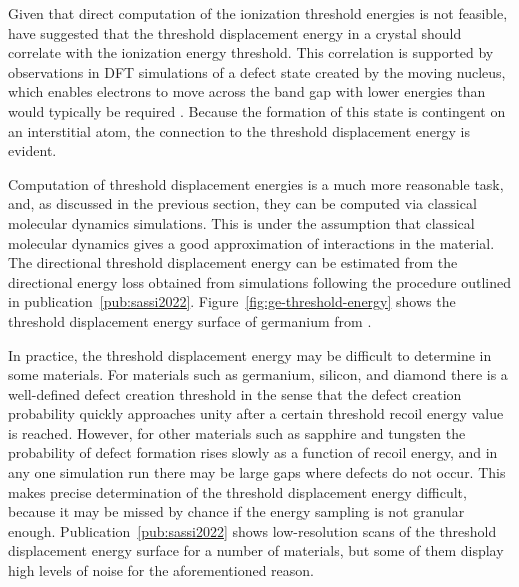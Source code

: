 Given that direct computation of the ionization threshold energies is not feasible, \textcite{KadribasicEtAl2018} have suggested that the threshold displacement energy in a crystal should correlate with the ionization energy threshold. This correlation is supported by observations in DFT simulations of a defect state created by the moving nucleus, which enables electrons to move across the band gap with lower energies than would typically be required \parencite{LimEtAl2016}. Because the formation of this state is contingent on an interstitial atom, the connection to the threshold displacement energy is evident.

Computation of threshold displacement energies is a much more reasonable task, and, as discussed in the previous section, they can be computed via classical molecular dynamics simulations. This is under the assumption that classical molecular dynamics gives a good approximation of interactions in the material. The directional threshold displacement energy can be estimated from the directional energy loss obtained from simulations following the procedure outlined in publication~\ref{pub:sassi2022}. Figure~\ref{fig:ge-threshold-energy} shows the threshold displacement energy surface of germanium from \textcite{KadribasicEtAl2018}. 

In practice, the threshold displacement energy may be difficult to determine in some materials. For materials such as germanium, silicon, and diamond there is a well-defined defect creation threshold in the sense that the defect creation probability quickly approaches unity after a certain threshold recoil energy value is reached. However, for other materials such as sapphire and tungsten the probability of defect formation rises slowly as a function of recoil energy, and in any one simulation run there may be large gaps where defects do not occur. This makes precise determination of the threshold displacement energy difficult, because it may be missed by chance if the energy sampling is not granular enough. Publication~\ref{pub:sassi2022} shows low-resolution scans of the threshold displacement energy surface for a number of materials, but some of them display high levels of noise for the aforementioned reason.

